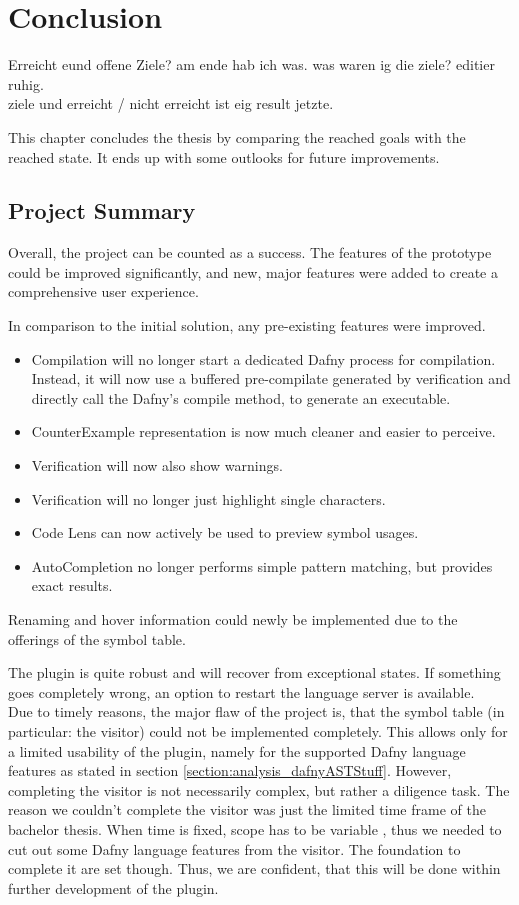 \section{Conclusion}
\label{section:conclusion}
Erreicht eund offene Ziele? am ende hab ich was. was waren ig die ziele? editier ruhig. \\
ziele und erreicht / nicht erreicht ist eig result jetzte.


This chapter concludes the thesis by comparing the reached goals with the reached state.
It ends up with some outlooks for future improvements.

\subsection{Project Summary}
Overall, the project can be counted as a success.
The features of the prototype could be improved significantly, and new, major features were added to create a comprehensive user experience.

In comparison to the initial solution, any pre-existing features were improved.
\begin{itemize}
 \item Compilation will no longer start a dedicated Dafny process for compilation. Instead, it will now use a buffered pre-compilate generated by verification and directly call the Dafny's compile method, to generate an executable.
 \item CounterExample representation is now much cleaner and easier to perceive.
 \item Verification will now also show warnings.
 \item Verification will no longer just highlight single characters.
 \item Code Lens can now actively be used to preview symbol usages.
 \item AutoCompletion no longer performs simple pattern matching, but provides exact results.
\end{itemize}
Renaming and hover information could newly be implemented due to the offerings of the symbol table.

The plugin is quite robust and will recover from exceptional states.
If something goes completely wrong, an option to restart the language server is available.\\

Due to timely reasons, the major flaw of the project is, that the symbol table (in particular: the visitor) could not be implemented completely.
This allows only for a limited usability of the plugin, namely for the supported Dafny language features as stated in section \ref{section:analysis_dafnyASTStuff}.
However, completing the visitor is not necessarily complex, but rather a diligence task.
The reason we couldn't complete the visitor was just the limited time frame of the bachelor thesis.
When time is fixed, scope has to be variable \cite{keller}, thus we needed to cut out some Dafny language features from the visitor.
The foundation to complete it are set though.
Thus, we are confident, that this will be done within further development of the plugin.\\

